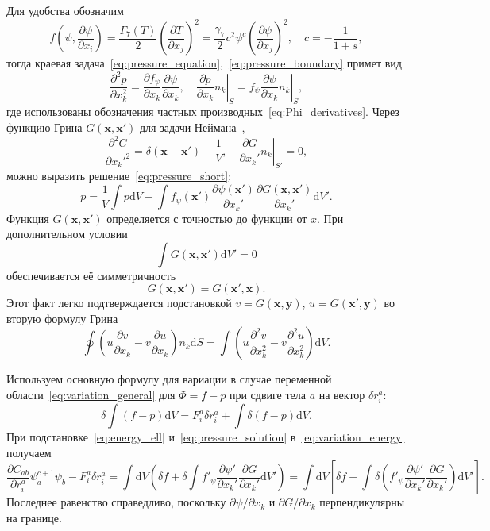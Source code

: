 \documentclass{article}
\theoremstyle{plain}
\newcommand{\dd}{\mathrm{d}}
\newcommand{\pder}[2][]{\frac{\partial#1}{\partial#2}}
\newcommand{\pderdual}[2][]{\frac{\partial^2#1}{\partial#2^2}}
\newcommand{\Pder}[2][]{\partial#1/\partial#2}
\newcommand{\bx}{\boldsymbol{x}}
\newcommand{\by}{\boldsymbol{y}}
\begin{document}
Для удобства обозначим
\begin{equation}\label{eq:g7_function}
    f\left(\psi,\pder[\psi]{x_i}\right) = \frac{\Gamma_7(T)}2\left(\pder[T]{x_j}\right)^2 =
    \frac{\gamma_7}2 c^2 \psi^c\left(\pder[\psi]{x_j}\right)^2, \quad c=-\frac1{1+s},
\end{equation}
тогда краевая задача~\eqref{eq:pressure_equation},~\eqref{eq:pressure_boundary} примет вид
\begin{equation}\label{eq:pressure_short}
    \pderdual[p]{x_k} = \pder[f_\psi]{x_k}\pder[\psi]{x_k}, \quad
    \left.\pder[p]{x_k}n_k\right|_S = \left.f_\psi\pder[\psi]{x_k}n_k\right|_S,
\end{equation}
где использованы обозначения частных производных~\eqref{eq:Phi_derivatives}.
Через функцию Грина \(G(\bx, \bx')\) для задачи Неймана~\cite{Franklin2012},
\begin{equation}\label{eq:Green_function}
    \pderdual[G]{x_k'} = \delta(\bx-\bx') - \frac1V, \quad
    \left.\pder[G]{x_k'}n_k\right|_{S'} = 0,
\end{equation}
можно выразить решение~\eqref{eq:pressure_short}:
\begin{equation}\label{eq:pressure_solution}
    p = \frac1V\int p\dd{V} - \int f_\psi(\bx')\pder[\psi(\bx')]{x_k'}\pder[G(\bx,\bx')]{x_k'} \dd{V'}.
\end{equation}
Функция \(G(\bx, \bx')\) определяется с точностью до функции от \(x\).
При дополнительном условии
\begin{equation}\label{eq:Green_normalization}
    \int G(\bx, \bx') \dd{V'} = 0
\end{equation}
обеспечивается её симметричность
\begin{equation}\label{eq:Green_symmetry}
    G(\bx, \bx') = G(\bx', \bx).
\end{equation}
Этот факт легко подтверждается подстановкой \(v=G(\bx,\by)\), \(u=G(\bx',\by)\)
во вторую формулу Грина
\begin{equation}\label{eq:Green_second_identity}
    \oint \left( u\pder[v]{x_k} - v\pder[u]{x_k} \right)n_k\dd{S} =
    \int \left( u\pderdual[v]{x_k} - v\pderdual[u]{x_k} \right)\dd{V}.
\end{equation}

Используем основную формулу для вариации в случае переменной области~\eqref{eq:variation_general}
для \(\Phi = f-p\) при сдвиге тела \(a\) на вектор \(\delta r^a_i\):
\begin{equation}\label{eq:variation_energy}
    \delta\int(f-p)\dd{V} = F^a_i \delta r^a_i + \int\delta(f-p)\dd{V}.
\end{equation}
При подстановке~\eqref{eq:energy_ell} и~\eqref{eq:pressure_solution} в~\eqref{eq:variation_energy} получаем
\begin{equation}\label{eq:variation_energy2}
    \pder[C_{ab}]{r^a_i} \psi^{c+1}_a \psi_b - F^a_i \delta r^a_i =
    \int\dd{V}\left( \delta{f} + \delta\int f'_\psi\pder[\psi']{x_k'}\pder[G]{x_k'} \dd{V'} \right) =
    \int\dd{V}\left[ \delta{f} + \int\delta\left( f'_\psi\pder[\psi']{x_k'}\pder[G]{x_k'}\right) \dd{V'} \right].
\end{equation}
Последнее равенство справедливо, поскольку \(\Pder[\psi]{x_k}\) и \(\Pder[G]{x_k}\) перпендикулярны на границе.
\end{document}
